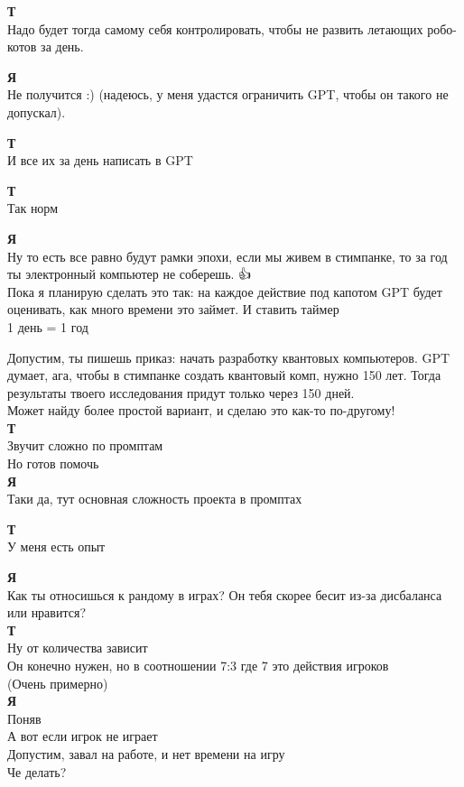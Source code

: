 \textbf{Т} \\
Надо будет тогда самому себя контролировать, чтобы не развить летающих робо-котов за день.

\textbf{Я} \\
Не получится :) (надеюсь, у меня удастся ограничить GPT, чтобы он такого не допускал).

\textbf{Т} \\
И все их за день написать в GPT

\textbf{Т} \\
Так норм

\textbf{Я} \\
Ну то есть все равно будут рамки эпохи, если мы живем в стимпанке, то за год ты электронный компьютер не соберешь. 👍👨‍💻\\

Пока я планирую сделать это так: на каждое действие под капотом GPT будет оценивать, как много времени это займет. И ставить таймер \\
1 день = 1 год

Допустим, ты пишешь приказ: начать разработку квантовых компьютеров. GPT думает, ага, чтобы в стимпанке создать квантовый комп, нужно 150 лет. Тогда результаты твоего исследования придут только через 150 дней.\\

Может найду более простой вариант, и сделаю это как-то по-другому!\\

\textbf{Т} \\
Звучит сложно по промптам \\
Но готов помочь\\

\textbf{Я} \\
Таки да, тут основная сложность проекта в промптах

\textbf{Т} \\
У меня есть опыт

\textbf{Я} \\
Как ты относишься к рандому в играх? Он тебя скорее бесит из-за дисбаланса или нравится?\\

\textbf{Т} \\
Ну от количества зависит \\
Он конечно нужен, но в соотношении 7:3 где 7 это действия игроков \\
(Очень примерно)\\

\textbf{Я} \\
Поняв \\
А вот если игрок не играет \\
Допустим, завал на работе, и нет времени на игру \\
Че делать?

